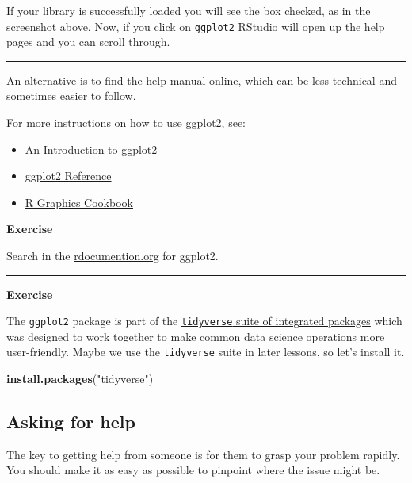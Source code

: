 \documentclass[
]{article}
\newenvironment{Shaded}{\begin{snugshade}}{\end{snugshade}}
\newcommand{\KeywordTok}[1]{\textcolor[rgb]{0.13,0.29,0.53}{\textbf{#1}}}
\newcommand{\NormalTok}[1]{#1}
\newcommand{\StringTok}[1]{\textcolor[rgb]{0.31,0.60,0.02}{#1}}
\providecommand{\tightlist}{%
  \setlength{\itemsep}{0pt}\setlength{\parskip}{0pt}}
\begin{document}
If your library is successfully loaded you will see the box checked, as
in the screenshot above. Now, if you click on \texttt{ggplot2} RStudio
will open up the help pages and you can scroll through.

\begin{center}\rule{0.5\linewidth}{0.5pt}\end{center}

An alternative is to find the help manual online, which can be less
technical and sometimes easier to follow.

For more instructions on how to use ggplot2, see:

\begin{itemize}
\tightlist
\item
  \href{https://uc-r.github.io/ggplot_intro}{An Introduction to ggplot2}
\item
  \href{https://ggplot2.tidyverse.org/reference/index.html}{ggplot2
  Reference}
\item
  \href{https://r-graphics.org/\#}{R Graphics Cookbook}
\end{itemize}

\textbf{Exercise}

Search in the \href{https://www.rdocumentation.org/}{rdocumention.org}
for ggplot2.

\begin{center}\rule{0.5\linewidth}{0.5pt}\end{center}

\textbf{Exercise}

The \texttt{ggplot2} package is part of the
\href{https://www.tidyverse.org/packages/}{\texttt{tidyverse} suite of
integrated packages} which was designed to work together to make common
data science operations more user-friendly. Maybe we use the
\texttt{tidyverse} suite in later lessons, so let's install it.

\begin{Shaded}
\begin{Highlighting}[]
\KeywordTok{install.packages}\NormalTok{(}\StringTok{"tidyverse"}\NormalTok{)}
\end{Highlighting}
\end{Shaded}

\hypertarget{asking-for-help}{%
\subsection{Asking for help}\label{asking-for-help}}

The key to getting help from someone is for them to grasp your problem
rapidly. You should make it as easy as possible to pinpoint where the
issue might be.
\end{document}
